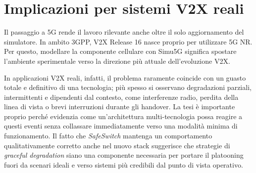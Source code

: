\section{Implicazioni per sistemi V2X reali}

Il passaggio a 5G rende il lavoro rilevante anche oltre il solo aggiornamento del simulatore. In ambito 3GPP, V2X Release 16 nasce proprio per utilizzare 5G NR. Per questo, modellare la componente cellulare con Simu5G significa spostare l'ambiente sperimentale verso la direzione più attuale dell'evoluzione V2X.

In applicazioni V2X reali, infatti, il problema raramente coincide con un guasto totale e definitivo di una tecnologia; più spesso si osservano degradazioni parziali, intermittenti e dipendenti dal contesto, come interferenze radio, perdita della linea di vista o brevi interruzioni durante gli handover. La tesi è importante proprio perché evidenzia come un'architettura multi-tecnologia possa reagire a questi eventi senza collassare immediatamente verso una modalità minima di funzionamento. Il fatto che \emph{SafeSwitch} mantenga un comportamento qualitativamente corretto anche nel nuovo stack suggerisce che strategie di \emph{graceful degradation} siano una componente necessaria per portare il platooning fuori da scenari ideali e verso sistemi più credibili dal punto di vista operativo.
